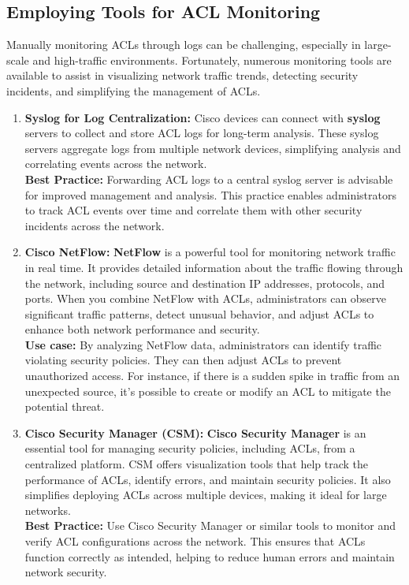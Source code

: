 \documentclass[11pt,a4paper]{article}
\begin{document}
    \subsection*{Employing Tools for ACL Monitoring}
    Manually monitoring ACLs through logs can be challenging, especially in large-scale and high-traffic environments. Fortunately, numerous monitoring tools are available to assist in visualizing network traffic trends, detecting security incidents, and simplifying the management of ACLs.

        \begin{enumerate}
            \item \textbf{Syslog for Log Centralization:} Cisco devices can connect with \textbf{syslog} servers to collect and store ACL logs for long-term analysis. These syslog servers aggregate logs from multiple network devices, simplifying analysis and correlating events across the network.
            \\[1em]
            \textbf{Best Practice:} Forwarding ACL logs to a central syslog server is advisable for improved management and analysis. This practice enables administrators to track ACL events over time and correlate them with other security incidents across the network.

            \item \textbf{Cisco NetFlow:} \textbf{NetFlow} is a powerful tool for monitoring network traffic in real time. It provides detailed information about the traffic flowing through the network, including source and destination IP addresses, protocols, and ports. When you combine NetFlow with ACLs, administrators can observe significant traffic patterns, detect unusual behavior, and adjust ACLs to enhance both network performance and security.
            \\[1em]
            \textbf{Use case:} By analyzing NetFlow data, administrators can identify traffic violating security policies. They can then adjust ACLs to prevent unauthorized access. For instance, if there is a sudden spike in traffic from an unexpected source, it’s possible to create or modify an ACL to mitigate the potential threat.

            \item \textbf{Cisco Security Manager (CSM):} \textbf{Cisco Security Manager} is an essential tool for managing security policies, including ACLs, from a centralized platform. CSM offers visualization tools that help track the performance of ACLs, identify errors, and maintain security policies. It also simplifies deploying ACLs across multiple devices, making it ideal for large networks.
            \\[1em]
            \textbf{Best Practice:} Use Cisco Security Manager or similar tools to monitor and verify ACL configurations across the network. This ensures that ACLs function correctly as intended, helping to reduce human errors and maintain network security.



\end{enumerate}
\end{document}
